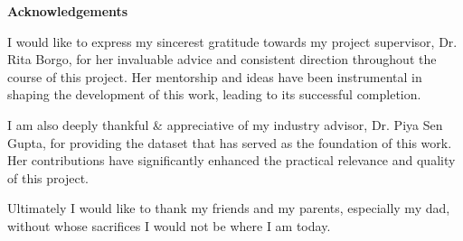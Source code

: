 
\mbox{}\newline\vspace{10mm} \mbox{}\LARGE
%
{\bf Acknowledgements} \normalsize \vspace{5mm}

\par I would like to express my sincerest gratitude towards my project supervisor, Dr. Rita Borgo, for her invaluable advice and consistent direction throughout the course of this project. Her mentorship and ideas have been instrumental in shaping the development of this work, leading to its successful completion.

\par I am also deeply thankful \& appreciative of my industry advisor, Dr. Piya Sen Gupta, for providing the dataset that has served as the foundation of this work. Her contributions have significantly enhanced the practical relevance and quality of this project.

\par Ultimately I would like to thank my friends and my parents, especially my dad, without whose sacrifices I would not be where I am today.

